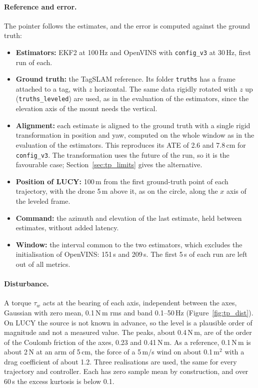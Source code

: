 \paragraph{Reference and error.} The pointer follows the estimates, and the error is computed against the ground truth:
\begin{itemize}
\item \textbf{Estimators:} EKF2 at 100\,Hz and OpenVINS with \texttt{config\_v3} at 30\,Hz, first run of each.
\item \textbf{Ground truth:} the TagSLAM reference. Its folder \texttt{truths} has a frame attached to a tag, with $z$ horizontal. The same data rigidly rotated with $z$ up (\texttt{truths\_leveled}) are used, as in the evaluation of the estimators, since the elevation axis of the mount needs the vertical.
\item \textbf{Alignment:} each estimate is aligned to the ground truth with a single rigid transformation in position and yaw, computed on the whole window as in the evaluation of the estimators. This reproduces its ATE of 2.6 and 7.8\,cm for \texttt{config\_v3}. The transformation uses the future of the run, so it is the favourable case; Section~\ref{sec:tp_limits} gives the alternative.
\item \textbf{Position of LUCY:} 100\,m from the first ground-truth point of each trajectory, with the drone 5\,m above it, as on the circle, along the $x$ axis of the leveled frame.
\item \textbf{Command:} the azimuth and elevation of the last estimate, held between estimates, without added latency.
\item \textbf{Window:} the interval common to the two estimators, which excludes the initialisation of OpenVINS: 151\,s and 209\,s. The first 5\,s of each run are left out of all metrics.
\end{itemize}

\paragraph{Disturbance.} A torque $\tau_w$ acts at the bearing of each axis, independent between the axes, Gaussian with zero mean, 0.1\,N\,m rms and band 0.1--50\,Hz (Figure~\ref{fig:tp_dist}). On LUCY the source is not known in advance, so the level is a plausible order of magnitude and not a measured value. The peaks, about 0.4\,N\,m, are of the order of the Coulomb friction of the axes, 0.23 and 0.41\,N\,m. As a reference, 0.1\,N\,m is about 2\,N at an arm of 5\,cm, the force of a 5\,m/s wind on about 0.1\,m$^2$ with a drag coefficient of about 1.2. Three realisations are used, the same for every trajectory and controller. Each has zero sample mean by construction, and over 60\,s the excess kurtosis is below 0.1.


